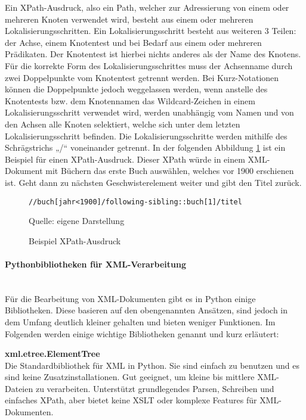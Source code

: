 Ein XPath-Ausdruck, also ein Path, welcher zur Adressierung von einem oder mehreren Knoten verwendet wird,
besteht aus einem oder mehreren Lokalisierungsschritten.
Ein Lokalisierungsschritt besteht aus weiteren 3 Teilen: der Achse, einem Knotentest und bei Bedarf aus einem oder mehreren Prädikaten.
Der Knotentest ist hierbei nichts anderes als der Name des Knotens.
Für die korrekte Form des Lokalisierungsschrittes muss der Achsenname durch zwei Doppelpunkte vom Knotentest getrennt werden.
Bei Kurz-Notationen können die Doppelpunkte jedoch weggelassen werden, wenn anstelle des Knotentests bzw.
dem Knotennamen das Wildcard-Zeichen in einem Lokalisierungsschritt verwendet wird,
werden unabhängig vom Namen und von den Achsen alle Knoten selektiert, welche sich unter dem letzten Lokalisierungsschritt befinden.
Die Lokalisierungsschritte werden mithilfe des Schrägstrichs „/“ voneinander getrennt. \cite{XPath2025}
In der folgenden Abbildung \ref{fig: XPath-Ausdruck} ist ein Beispiel für einen XPath-Ausdruck.
Dieser XPath würde in einem XML-Dokument mit Büchern das erste Buch auswählen, welches vor 1900 erschienen ist.
Geht dann zu nächsten Geschwisterelement weiter und gibt den Titel zurück.


\begin{figure}[H]
\centering
\begin{minipage}{0.95\textwidth}
\begin{lstlisting}[language=XPath]
//buch[jahr<1900]/following-sibling::buch[1]/titel
\end{lstlisting}
\end{minipage}
\caption{Beispiel XPath-Ausdruck}
\label{fig: XPath-Ausdruck}
    {Quelle: eigene Darstellung}
\end{figure}


\paragraph{Pythonbibliotheken für XML-Verarbeitung}\mbox{}\\

Für die Bearbeitung von \ac{XML}-Dokumenten gibt es in Python einige Bibliotheken.
Diese basieren auf den obengenannten Ansätzen, sind jedoch in dem Umfang deutlich kleiner gehalten und bieten weniger Funktionen.
Im Folgenden werden einige wichtige Bibliotheken genannt und kurz erläutert:

\textbf{xml.etree.ElementTree}\\
Die Standardbibliothek für XML in Python.
Sie sind einfach zu benutzen und es sind keine Zusatzinstallationen.
Gut geeignet, um kleine bis mittlere XML-Dateien zu verarbeiten.
Unterstützt grundlegendes Parsen, Schreiben und einfaches XPath, aber bietet keine \ac{XSLT} oder komplexe Features für \ac{XML}-Dokumenten. \cite*{ElementTree2025}

